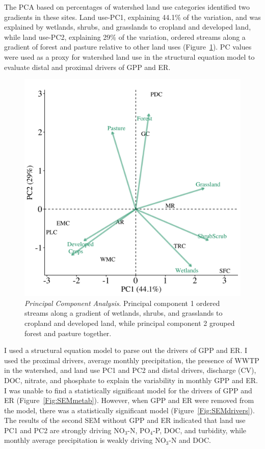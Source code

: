 The PCA based on percentages of watershed land use categories identiﬁed two gradients in these sites. Land use-PC1, explaining 44.1\% of the variation, and was explained by wetlands, shrubs, and grasslands to cropland and developed land, while land use-PC2, explaining 29\% of the variation, ordered streams along a gradient of forest and pasture relative to other land uses  (Figure~\ref{Fig:PCA}). PC values were used as a proxy for watershed land use in the structural equation model to evaluate distal and proximal drivers of GPP and ER.

\begin{figure}[htb]
\begin{center}
\includegraphics[scale=0.2]{Figs/PCA.png}
\caption[Principal Component Analysis]{\textit{Principal Component Analysis}. Principal component 1 ordered streams along a gradient of wetlands, shrubs, and grasslands to cropland and developed land, while principal component 2 grouped forest and pasture together.}
\label{Fig:PCA}
\end{center}
\end{figure}


I used a structural equation model to parse out the drivers of GPP and ER. I used the proximal drivers, average monthly precipitation, the presence of WWTP in the watershed, and land use PC1 and PC2 and distal drivers, discharge (CV), DOC, nitrate, and phosphate to explain the variability in monthly GPP and ER. I was unable to find a statistically significant model for the drivers of GPP and ER (Figure~\ref{Fig:SEMmetab}). However, when GPP and ER were removed from the model, there was a statistically significant model (Figure~\ref{Fig:SEMdrivers}). The results of the second SEM without GPP and ER indicated that land use PC1 and PC2 are strongly driving NO$_3$-N, PO$_4$-P, DOC, and turbidity, while monthly average precipitation is weakly driving NO$_3$-N and DOC.

